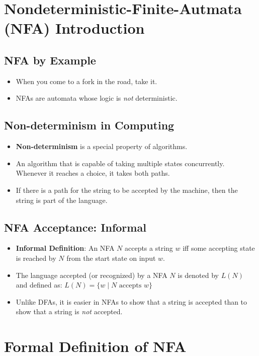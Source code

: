 
\section{Nondeterministic-Finite-Autmata (NFA) Introduction}

\subsection{NFA by Example}
\begin{itemize}
    \item When you come to a fork in the road, take it.
    \item NFAs are automata whose logic is \textit{not} deterministic.
\end{itemize}

\subsection{Non-determinism in Computing}
\begin{itemize}
    \item \textbf{Non-determinism} is a special property of algorithms.
    \item An algorithm that is capable of taking multiple states concurrently. Whenever it reaches a choice, it takes both paths.
    \item If there is a path for the string to be accepted by the machine, then the string is part of the language.
\end{itemize}

\subsection{NFA Acceptance: Informal}
\begin{itemize}
    \item \textbf{Informal Definition}: An NFA $N$ accepts a string $w$ iff some accepting state is reached by $N$ from the start state on input $w$.
    \item The language accepted (or recognized) by a NFA $N$ is denoted by $L(N)$ and defined as: $L(N) = \{ w \mid N \text{ accepts } w \}$
    \item Unlike DFAs, it is easier in NFAs to show that a string is accepted than to show that a string is \textit{not} accepted.
\end{itemize}

\section{Formal Definition of NFA}

